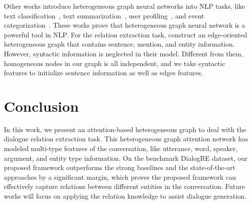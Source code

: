 \documentclass[letterpaper]{article} \usepackage{aaai21}  \usepackage{times}  \usepackage{helvet} \usepackage{courier}  \usepackage[hyphens]{url}  \usepackage{graphicx} \urlstyle{rm} \def\UrlFont{\rm}  \usepackage{natbib}  \usepackage{caption} \frenchspacing  \setlength{\pdfpagewidth}{8.5in}  \setlength{\pdfpageheight}{11in}
\begin{document}
Other works introduce heterogeneous graph neural networks into NLP tasks, like text classification~\cite{linmei2019heterogeneous}, text summarization~\cite{wang2020heterogeneous}, user profiling~\cite{chen2019semi}, and event categorization~\cite{peng2019fine}. These works prove that heterogeneous graph neural network is a powerful tool in NLP. For the relation extraction task, \citet{christopoulou2019connecting} construct an edge-oriented heterogeneous graph that contains sentence, mention, and entity information. However, syntactic information is neglected in their model. Different from them, homogeneous nodes in our graph is all independent, and we take syntactic features to initialize sentence information as well as edges features.



\section{Conclusion}
\label{conclusion}
In this work, we present an attention-based heterogeneous graph to deal with the dialogue relation extraction task. This heterogeneous graph attention network has modeled multi-type features of the conversation, like utterance, word, speaker, argument, and entity type information. On the benchmark DialogRE dataset, our proposed framework outperforms the strong baselines and the state-of-the-art approaches by a significant margin, which proves the proposed framework can effectively capture relations between different entities in the conversation. Future works will focus on applying the relation knowledge to assist dialogue generation.


\end{document}
